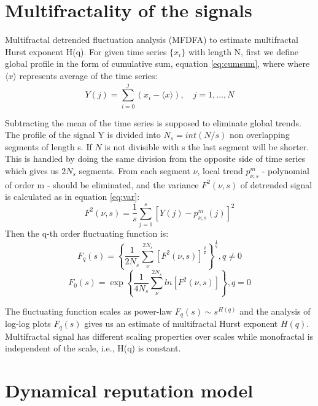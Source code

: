 \section{Multifractality of the signals}

Multifractal detrended fluctuation analysis (MFDFA) \cite{kantelhardt2002, ihlen2012} to estimate multifractal Hurst exponent H(q). For given time series $\{x_i\}$ with length N, first we define global profile in the form of cumulative sum, equation \ref{eq:cumsum}, where where $\langle x\rangle $ represents average of the time series:
\begin{equation}
Y(j) = \sum_{i=0} ^j (x_i - \langle x\rangle), \quad j=1, ..., N
\label{eq:cumsum}
\end{equation}

Subtracting the mean of the time series is supposed to eliminate global trends. The profile of the signal Y is divided into $N_s = int (N/s)$ non overlapping segments of length s. If $N$ is not divisible with s the last segment will be shorter. This is handled by doing the same division from the opposite side of time series which gives us $2N_s$ segments. From each segment $\nu$, local trend $p^m_{\nu, s}$ - polynomial of order m - should be eliminated, and the variance $F^2(\nu, s)$ of detrended signal is calculated as in equation \ref{eq:var}:
\begin{equation}
F^2(\nu, s) = \frac{1}{s}\sum_{j=1}^s \left[Y(j) - p^m_{\nu, s}(j)\right]^2
\label{eq:var}
\end{equation}
Then the q-th order fluctuating function is: 
\begin{equation}
F_q(s) = \left\{\frac{1}{2N_s}\sum_{\nu}^{2N_s}\left[F^2(\nu, s)\right]^{\frac{q}{2}}\right\}^{\frac{1}{q}},  q \neq 0 \nonumber
\end{equation}
\begin{equation}
F_0(s) = \exp \left\{\frac{1}{4N_s}\sum_{\nu}^{2N_s}ln \left[F^2(\nu, s)\right]\right\}, q=0
\end{equation}

The fluctuating function scales as power-law $F_q(s) \sim s^{H(q)}$ and the analysis of log-log plots $F_q(s)$ gives us an estimate of multifractal Hurst exponent $H(q)$. Multifractal signal has different scaling properties over scales while monofractal is independent of the scale, i.e., H(q) is constant. 

\section{Dynamical reputation model}

